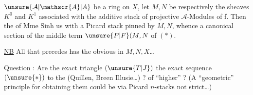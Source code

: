 
\uline{}\unsure{:|,}  $\unsure{\mathcal{A}|\mathscr{A}|A}$ be a ring on $X$, let $M,N$ be respectively the sheaves $K^{0}$ and $K^{1}$ associated with the additive stack of projective $\mathcal{A}$-Modules of  f.  Then the  of Mme Sinh  us with a Picard stack pinned by $M,N$, whence a canonical section  of the middle term $\unsure{P|F}(M,N$ of $(*)$.

\uline{NB} All that precedes has the obvious  in $M,N,X$\ldots

\uline{Question} : Are the exact triangle $(\unsure{T|J})$  the exact sequence $(\unsure{*})$  to the  (Quillen, Breen Illusie\ldots) ?  of ``higher''  ? (A ``geometric'' principle for obtaining them could be via Picard $n$-stacks not  strict\ldots)


